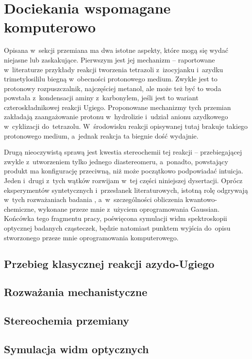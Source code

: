 \chapter{Dociekania wspomagane komputerowo}\label{chapter:numeric}

Opisana w~sekcji  przemiana ma dwa istotne aspekty, które mogą
  się wydać niejasne lub zaskakujące.
Pierwszym jest jej mechanizm \--- raportowane w~literaturze przykłady reakcji tworzenia
  tetrazoli z~izocyjanku i~azydku trimetylosililu biegną w~obecności protonowego medium.
Zwykle jest to protonowy rozpuszczalnik, najczęściej metanol, ale może też być to woda powstała
  z~kondensacji aminy z~karbonylem, jeśli jest to wariant czteroskładnikowej reakcji Ugiego.
Proponowane mechanizmy tych przemian zakładają zaangażowanie protonu w~hydrolizie 
  i~udział anionu azydkowego w~cyklizacji do~tetrazolu.
W~środowisku reakcji opisywanej tutaj brakuje takiego protonowego medium, a~jednak reakcja
  ta biegnie dość wydajnie.

Drugą nieoczywistą sprawą jest kwestia stereochemii tej reakcji \--- przebiegającej zwykle
  z~utworzeniem tylko jednego diastereomeru, a~ponadto, powstający produkt ma konfigurację
  przeciwną, niż może początkowo podpowiadać intuicja.
Jeden i~drugi z~tych wątków rozwijam w~tej części niniejszej dysertacji.
Oprócz eksperymentów syntetycznych i~przesłanek literaturowych, istotną rolę odgrywają w~tych
  rozważaniach badania , a~w~szczególności obliczenia kwantowo-chemiczne,
  wykonane przeze mnie z~użyciem oprogramowania Gaussian.
Końcówka tego fragmentu pracy, poświęcona symulacji widm spektroskopii optycznej badanych
  cząsteczek, będzie natomiast punktem wyjścia do~opisu stworzonego przeze mnie
  oprogramowania komputerowego.

\section{Przebieg klasycznej reakcji azydo-Ugiego}\label{numeric:classical}
\section{Rozważania mechanistyczne}\label{numeric:mechanism}
\section{Stereochemia przemiany}\label{numeric:stereo}
\section{Symulacja widm optycznych}\label{numeric:spectra}

